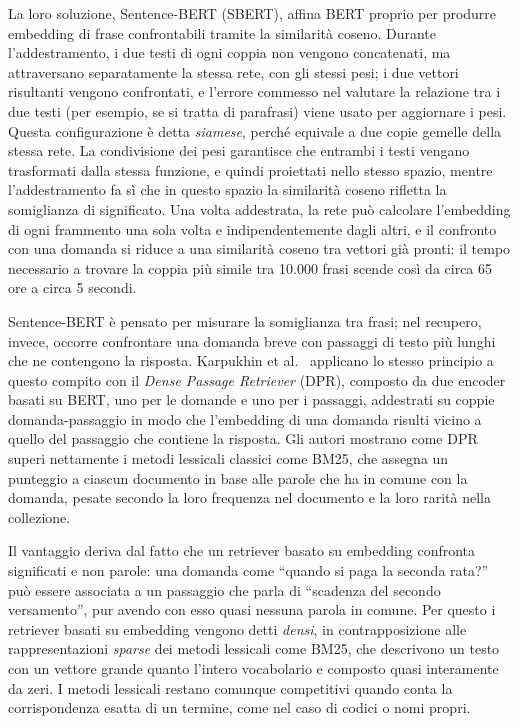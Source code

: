 La loro soluzione, Sentence-BERT (SBERT), affina BERT proprio per produrre embedding di frase confrontabili tramite la
similarità coseno. Durante l'addestramento, i due testi di ogni coppia non vengono concatenati, ma attraversano
separatamente la stessa rete, con gli stessi pesi; i due vettori risultanti vengono confrontati, e l'errore commesso
nel valutare la relazione tra i due testi (per esempio, se si tratta di parafrasi) viene usato per aggiornare i pesi.
Questa configurazione è detta \emph{siamese}, perché equivale a due copie gemelle della stessa rete. La condivisione dei
pesi garantisce che entrambi i testi vengano trasformati dalla stessa funzione, e quindi proiettati nello stesso
spazio, mentre l'addestramento fa sì che in questo spazio la similarità coseno rifletta la somiglianza di significato.
Una volta addestrata, la rete può calcolare l'embedding di ogni frammento una sola volta e indipendentemente dagli altri,
e il confronto con una domanda si riduce a una similarità coseno tra vettori già pronti: il tempo necessario a trovare
la coppia più simile tra 10.000 frasi scende così da circa 65 ore a circa 5 secondi.

Sentence-BERT è pensato per misurare la somiglianza tra frasi; nel recupero, invece, occorre confrontare una domanda
breve con passaggi di testo più lunghi che ne contengono la risposta. Karpukhin et al.\ \cite{karpukhin2020dpr}
applicano lo stesso principio a questo compito con il \emph{Dense Passage Retriever} (DPR), composto da due encoder
basati su BERT, uno per le domande e uno per i passaggi, addestrati su coppie domanda-passaggio in modo che l'embedding
di una domanda risulti vicino a quello del passaggio che contiene la risposta. Gli autori mostrano come DPR superi nettamente i metodi lessicali classici come BM25, che assegna un punteggio a ciascun documento in base alle parole che ha in
comune con la domanda, pesate secondo la loro frequenza nel documento e la loro rarità nella collezione.

Il vantaggio deriva dal fatto che un retriever basato su embedding confronta significati e non parole: una domanda come
``quando si paga la seconda rata?'' può essere associata a un passaggio che parla di ``scadenza del secondo versamento'',
pur avendo con esso quasi nessuna parola in comune. Per questo i retriever basati su embedding vengono detti
\emph{densi}, in contrapposizione alle rappresentazioni \emph{sparse} dei metodi lessicali come BM25, che descrivono un
testo con un vettore grande quanto l'intero vocabolario e composto quasi interamente da zeri. I metodi lessicali
restano comunque competitivi quando conta la corrispondenza esatta di un termine, come nel caso di codici o nomi propri.

